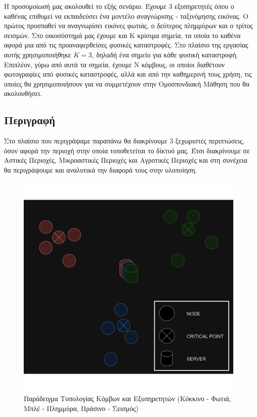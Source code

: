Η προσομοίωσή μας ακολουθεί το εξής σενάριο. Έχουμε 3 εξυπηρετητές όπου ο καθένας επιθυμεί να εκπαιδεύσει ένα μοντέλο αναγνώρισης - ταξινόμησης εικόνας. Ο πρώτος προσπαθεί να αναγνωρίσει εικόνες φωτιάς, ο δεύτερος πλημμύρων και ο τρίτος σεισμών. Στο οικοσύστημά μας έχουμε και Κ κρίσιμα σημεία, τα οποία το καθένα αφορά μια από τις προαναφερθείσες φυσικές καταστροφές. Στο πλαίσιο της εργασίας αυτής χρησιμοποιήθηκε $K=3$, δηλαδή ένα σημείο για κάθε φυσική καταστροφή. Επιπλέον, γύρω από αυτά τα σημεία, έχουμε Ν κόμβους, οι οποίοι διαθέτουν φωτογραφίες από φυσικές καταστροφές, αλλά και από την καθημερινή τους χρήση, τις οποίες θα χρησιμοποιήσουν για να συμμετέχουν στην Ομοσπονδιακή Μάθηση που θα ακολουθήσει.

\subsection{Περιγραφή}

Στο πλαίσιο που περιγράψαμε παραπάνω θα διακρίνουμε 3 ξεχωριστές περιπτώσεις, όσον αφορά την περιοχή στην οποία τοποθετείται το δίκτυό μας. Έτσι διακρίνουμε σε Αστικές Περιοχές, Μικροαστικές Περιοχές και Αγροτικές Περιοχές και στη συνέχεια θα περιγράψουμε και αναλυτικά την διαφορά τους στην υλοποίηση. 

\begin{figure}[ht]
    \centering
    \includegraphics[width=\textwidth]{figures/chapter2/topology+ypomn.png}
    \vspace{-1cm}
    \caption{Παράδειγμα Τοπολογίας Κόμβων και Εξυπηρετητών (Κόκκινο - Φωτιά, Μπλέ - Πλημμύρα, Πράσινο - Σεισμός)}
    \label{fig46}
\end{figure}

